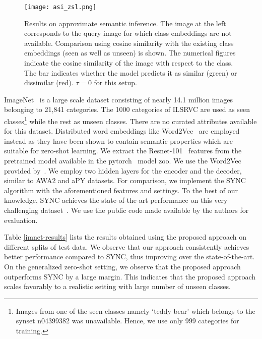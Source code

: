 \documentclass[10pt,twocolumn,letterpaper]{article}
\begin{document}
\begin{figure*}[]
	\centering
	\texttt{[image: asi\_zsl.png]}
	\caption{\small Results on approximate semantic inference. The image at the left corresponds to the query image for which class embeddings are not available. Comparison using cosine similarity with the existing class embeddings (seen as well as unseen) is shown. The numerical figures indicate the cosine similarity of the image with respect to the class. The bar indicates whether the model predicts it as similar (green) or dissimilar (red). $\tau=0$  for this setup.}
	\label{cosine_sim} 
\end{figure*}
ImageNet~\cite{deng2009imagenet} is a large scale dataset consisting of nearly 14.1 million images belonging to 21,841 categories. The 1000 categories of ILSRVC are used as seen classes\footnote{Images from one of the seen classes namely `teddy bear' which belongs to the synset n04399382 was unavailable. Hence, we use only 999 categories for training.} while the rest as unseen classes. There are no curated attributes available for this dataset. 
Distributed word embeddings like Word2Vec~\cite{mikolov2013distributed} are employed instead as they have been shown to contain semantic properties which are suitable for zero-shot learning. We extract the Resnet-101~\cite{he2016deep} features from the pretrained model available in the pytorch~\cite{pytorch} model zoo. We use the Word2Vec provided by~\cite{changpinyo2016synthesized}. We employ two hidden layers for the encoder and the decoder, similar to AWA2 and aPY datasets. %
For comparison, we implement the SYNC~\cite{changpinyo2016synthesized} algorithm with the aforementioned features and settings. To the best of our knowledge, SYNC achieves the state-of-the-art performance on this very challenging dataset~\cite{Xian_2017_CVPR,xian2017zero1}. We use the public code made available by the authors for evaluation.

Table \ref{imnet-results} lists the results obtained using the proposed approach on different splits of test data. 
We observe that our approach consistently achieves better performance compared to SYNC, thus improving over the state-of-the-art.
On the generalized zero-shot setting, we observe that the proposed approach outperforms SYNC by a large margin. This indicates that the proposed approach scales favorably to a realistic setting with large number of unseen classes. %
\end{document}
